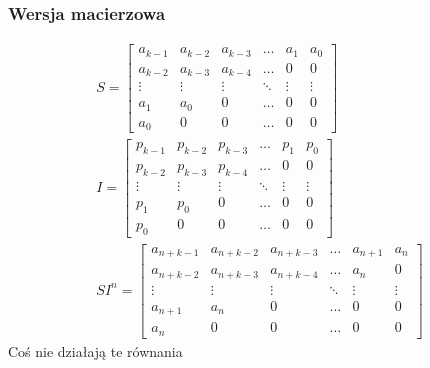 \documentclass{article}
\begin{document}
\subsubsection{Wersja macierzowa}
\begin{gather*}
S = \begin{bmatrix}
a_{k-1} & a_{k-2} & a_{k-3} & \dots & a_{1} & a_{0} \\
a_{k-2} & a_{k-3} & a_{k-4} & \dots & 0 & 0 \\
\vdots & \vdots & \vdots & \ddots & \vdots & \vdots \\
a_{1} & a_{0} & 0 & \dots & 0 & 0 \\
a_{0} & 0 & 0 & \dots & 0 & 0
\end{bmatrix} \\
I = \begin{bmatrix}
p_{k-1} & p_{k-2} & p_{k-3} & \dots & p_{1} & p_{0} \\
p_{k-2} & p_{k-3} & p_{k-4} & \dots & 0 & 0 \\
\vdots & \vdots & \vdots & \ddots & \vdots & \vdots \\
p_{1} & p_{0} & 0 & \dots & 0 & 0 \\
p_{0} & 0 & 0 & \dots & 0 & 0
\end{bmatrix} \\
SI^n = \begin{bmatrix}
a_{n + k-1} & a_{n + k-2} & a_{n + k-3} & \dots & a_{n + 1} & a_{n} \\
a_{n + k-2} & a_{n+k-3} & a_{n+k-4} & \dots & a_{n} & 0 \\
\vdots & \vdots & \vdots & \ddots & \vdots & \vdots \\
a_{n + 1} & a_{n} & 0 & \dots & 0 & 0 \\
a_{n} & 0 & 0 & \dots & 0 & 0
\end{bmatrix}
\end{gather*}
Coś nie działają te równania
\end{document}
